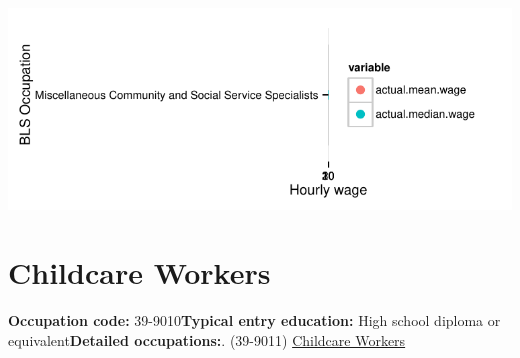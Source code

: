 \documentclass[a4paper,10pt]{article}\usepackage[]{graphicx}\usepackage[]{color}
\makeatletter
\def\maxwidth{ %
  \ifdim\Gin@nat@width>\linewidth
    \linewidth
  \else
    \Gin@nat@width
  \fi
}
\makeatother
\begin{document}
{\centering \includegraphics[width=\maxwidth]{figure/unnamed-chunk-247} 

}


\newpage\section{Childcare Workers}\textbf{Occupation code:} 39-9010\newline\textbf{Typical entry education:} High school diploma or equivalent\newline\textbf{Detailed occupations:}. (39-9011)  \href{http://www.bls.gov/oes/current/oes399011.htm}{Childcare Workers}\newline%
\end{document}
